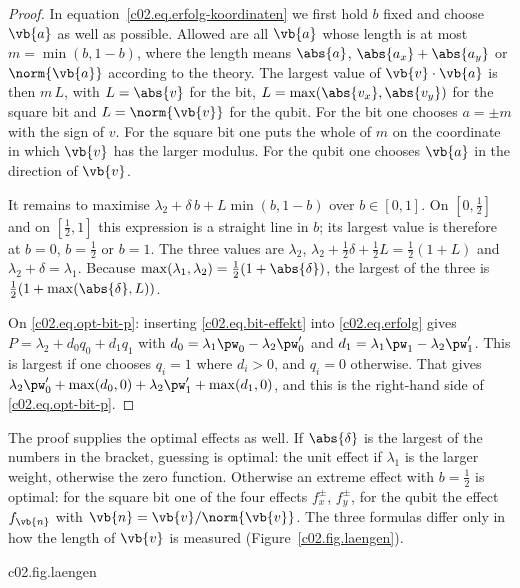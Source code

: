 \begin{proof}
  In equation~\eqref{c02.eq.erfolg-koordinaten} we first hold $b$ fixed and choose $\vb{a}$
  as well as possible. Allowed are all $\vb{a}$ whose length is at most
  $m = \min(b, 1-b)$, where the length means $\abs{a}$, $\abs{a_x} + \abs{a_y}$ or
  $\norm{\vb{a}}$ according to the theory. The largest value of
  $\vb{v}\cdot\vb{a}$ is then $m\, L$, with $L = \abs{v}$ for the bit,
  $L = \max(\abs{v_x}, \abs{v_y})$ for the square bit and $L = \norm{\vb{v}}$ for the qubit.
  For the bit one chooses $a = \pm m$ with the sign of $v$. For the square bit one puts the
  whole of $m$ on the coordinate in which $\vb{v}$ has the larger modulus. For the qubit
  one chooses $\vb{a}$ in the direction of $\vb{v}$.

  It remains to maximise $\lambda_2 + \delta\, b + L \min(b, 1-b)$ over $b \in [0,1]$. On
  $[0, \tfrac12]$ and on $[\tfrac12, 1]$ this expression is a straight line in $b$; its
  largest value is therefore at $b = 0$, $b = \tfrac12$ or $b = 1$. The three values are
  $\lambda_2$, $\lambda_2 + \tfrac12\delta + \tfrac12 L = \tfrac12(1 + L)$ and
  $\lambda_2 + \delta = \lambda_1$. Because
  $\max(\lambda_1, \lambda_2) = \tfrac12(1 + \abs{\delta})$, the largest of the three is
  $\tfrac12(1 + \max(\abs{\delta}, L))$.

  On \eqref{c02.eq.opt-bit-p}: inserting \eqref{c02.eq.bit-effekt} into
  \eqref{c02.eq.erfolg} gives $P = \lambda_2 + d_0 q_0 + d_1 q_1$ with
  $d_0 = \lambda_1 \pw_0 - \lambda_2 \pw'_0$ and $d_1 = \lambda_1 \pw_1 - \lambda_2 \pw'_1$.
  This is largest if one chooses $q_i = 1$ where $d_i > 0$, and $q_i = 0$ otherwise.
  That gives $\lambda_2 \pw'_0 + \max(d_0, 0) + \lambda_2 \pw'_1 + \max(d_1, 0)$, and this is
  the right-hand side of \eqref{c02.eq.opt-bit-p}.
\end{proof}

The proof supplies the optimal effects as well. If $\abs{\delta}$ is the largest of the
numbers in the bracket, guessing is optimal: the unit effect if $\lambda_1$ is the larger
weight, otherwise the zero function. Otherwise an extreme effect with $b = \tfrac12$ is
optimal: for the square bit one of the four effects $f_x^{\pm}$, $f_y^{\pm}$, for the qubit
the effect $f_{\vb{n}}$ with $\vb{n} = \vb{v}/\norm{\vb{v}}$. The three formulas differ
only in how the length of $\vb{v}$ is measured (Figure~\ref{c02.fig.laengen}).

\begin{tpcfigure}{c02.fig.laengen}
  \caption{How well can a state $x_1$ be told apart from the centre $x_2$ of the state
    space if both are prepared equally often? By Proposition~\ref{c02.prop.optimum} we
    then have $P_{\mathrm{opt}} = \tfrac12 + \tfrac14 L$, where $L$ is the length of the
    position vector of $x_1$ in the respective theory. Marked are the positions of $x_1$
    with $P_{\mathrm{opt}} = \tfrac58$ and $P_{\mathrm{opt}} = \tfrac34$: (a) points,
    (b) squares, (c) circles. More than $\tfrac34$ cannot be reached against the centre in
    any of the three theories.}
\end{tpcfigure}

